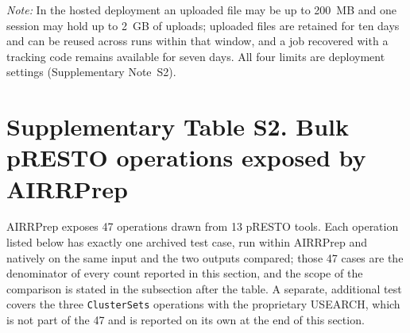 \documentclass[11pt]{article}
\begin{document}
\textit{Note:} In the hosted deployment an uploaded file may be up to 200~MB
and one session may hold up to 2~GB of uploads; uploaded files are retained for
ten days and can be reused across runs within that window, and a job recovered
with a tracking code remains available for seven days. All four limits are
deployment settings (Supplementary Note~S2).


\clearpage
\section*{Supplementary Table S2. Bulk pRESTO operations exposed by AIRRPrep}

AIRRPrep exposes 47 operations drawn from 13 pRESTO tools. Each operation
listed below has exactly one archived test case, run within AIRRPrep and
natively on the same input and the two outputs compared; those 47 cases are
the denominator of every count reported in this section, and the scope of the
comparison is stated in the subsection after the table. A separate,
additional test covers the three \texttt{ClusterSets} operations with the
proprietary USEARCH, which is not part of the 47 and is reported on its own at
the end of this section.
\end{document}
